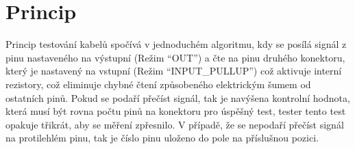 
\section{Princip}
Princip testování kabelů spočívá v jednoduchém algoritmu, kdy se posílá signál z pinu nastaveného na výstupní (Režim “OUT”) a čte na pinu druhého konektoru, který je nastavený na vstupní (Režim “INPUT\_PULLUP”) což aktivuje interní rezistory, což eliminuje chybné čtení způsobeného elektrickým šumem od ostatních pinů. Pokud se podaří přečíst signál, tak je navýšena kontrolní hodnota, která musí být rovna počtu pinů na konektoru pro úspěšný test, tester tento test opakuje třikrát, aby se měření zpřesnilo. V případě, že se nepodaří přečíst signál na protilehlém pinu, tak je číslo pinu uloženo do pole na příslušnou pozici.
